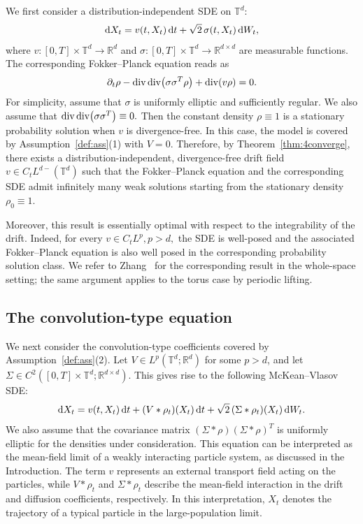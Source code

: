 \documentclass[UTF-8,reqno]{amsart}
\numberwithin{equation}{section}
\theoremstyle{definition}
\def\dif{{\mathord{{\rm d}}}}
\def\dif{{\mathord{{\rm d}}}}
\begin{document}
We first consider a distribution-independent SDE on $\mathbb{T}^d$:
\begin{align}
    \dif X_t
    =
    v(t,X_t)\,\dif t
    +
    \sqrt{2}\,\sigma(t,X_t)\,\dif W_t ,
    \notag
\end{align}
where
$v:[0,T]\times\mathbb{T}^d\to\mathbb{R}^d$ and
$\sigma:[0,T]\times\mathbb{T}^d\to\mathbb{R}^{d\times d}$ are measurable
functions. The corresponding Fokker--Planck equation reads as
\begin{align}
\partial_t\rho
-
\operatorname{div}\operatorname{div}\bigl(\sigma\sigma^T\rho\bigr)
+
\operatorname{div}(v\rho)
=
0 .
\notag
\end{align}
For simplicity, assume that $\sigma$ is uniformly elliptic and sufficiently
regular. We also assume that
$
\operatorname{div}\operatorname{div}\bigl(\sigma\sigma^T\bigr)
\equiv 0.
\notag
$ Then the constant density $\rho\equiv1$ is a
stationary probability solution when $v$ is divergence-free. In this case, the
model is covered by Assumption~\ref{def:ass}\textnormal{(1)} with $V=0$.
Therefore, by Theorem~\ref{thm:4converge}, there exists a
distribution-independent, divergence-free drift field
$
v\in C_tL^{d-}(\mathbb{T}^d)
$
such that the Fokker--Planck equation and the corresponding SDE admit
infinitely many weak solutions starting from the stationary density
$\rho_0\equiv1$.

Moreover, this result is essentially optimal with respect to the integrability
of the drift. Indeed, for every
$
v\in C_tL^p,
p>d,$
the SDE is  well-posed and the associated Fokker--Planck equation
is also well posed in the corresponding probability solution class. We refer
to Zhang~\cite{Zha11} for the corresponding result in the whole-space setting;
the same argument applies to the torus case by periodic lifting.

\subsection{The convolution-type equation}

We next consider the convolution-type coefficients covered by
Assumption~\ref{def:ass}\textnormal{(2)}. Let
$V\in L^p(\mathbb{T}^d;\mathbb{R}^d)$ for some $p>d$, and let
$\Sigma\in C^2([0,T]\times\mathbb{T}^d;\mathbb{R}^{d\times d})$. This gives
rise to the following McKean--Vlasov SDE:
\begin{align*}
\dif X_t
=
v(t,X_t)\,\dif t
+
(V*\rho_t)(X_t)\,\dif t
+
\sqrt{2}\,(\Sigma*\rho_t)(X_t)\,\dif W_t .
\end{align*}  We also assume that
the covariance matrix
$
(\Sigma*\rho)(\Sigma*\rho)^T
$
is uniformly elliptic for the densities under consideration.
This equation can be interpreted as the mean-field limit of a weakly
interacting particle system, as discussed in the Introduction. The term $v$
represents an external transport field acting on the particles, while
$V*\rho_t$ and $\Sigma*\rho_t$ describe the mean-field interaction in the
drift and diffusion coefficients, respectively. In this interpretation,
$X_t$ denotes the trajectory of a typical particle in the large-population
limit.
\end{document}
